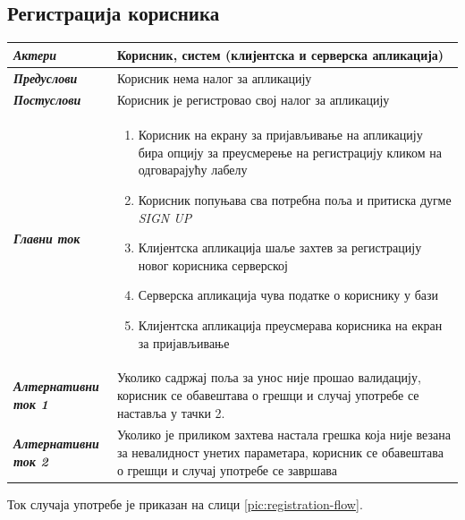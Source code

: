 \documentclass[12pt,oneside]{memoir}
\begin{document}
\subsection*{Регистрација корисника}
\begin{longtable}{p{0.23\linewidth} p{0.77\linewidth}}
 \hline
 \textit{\textbf{Актери}} & Корисник, систем (клијентска и серверска апликација) \\
\hline
\textit{\textbf{Предуслови}} & Корисник нема налог за апликацију \\
 \hline
\textit{\textbf{Постуслови}} & Корисник је регистровао свој налог за апликацију \\
 \hline
 \textit{\textbf{Главни ток}} &  
    \begin{enumerate}
        \item Корисник на екрану за пријављивање на апликацију бира опцију за преусмерење на регистрацију кликом на одговарајућу лабелу
        \item Корисник попуњава сва потребна поља и притиска дугме \textit{SIGN UP} 
        \item Клијентска апликација шаље захтев за регистрацију новог корисника серверској
        \item Серверска апликација чува податке о кориснику у бази
        \item Клијентска апликација преусмерава корисника на екран за пријављивање
    \end{enumerate}\\
 \hline
\textit{\textbf{Алтернативни ток 1}} & Уколико садржај поља за унос није прошао валидацију, корисник се обавештава о грешци и случај употребе се наставља у тачки 2.\\
 \hline
\textit{\textbf{Алтернативни ток 2}} & Уколико је приликом захтева настала грешка која није везана за невалидност унетих параметара, корисник се обавештава о грешци и случај употребе се завршава \\
 \hline
\end{longtable} 

\noindent Ток случаја употребе је приказан на слици \ref{pic:registration-flow}.
\end{document}
